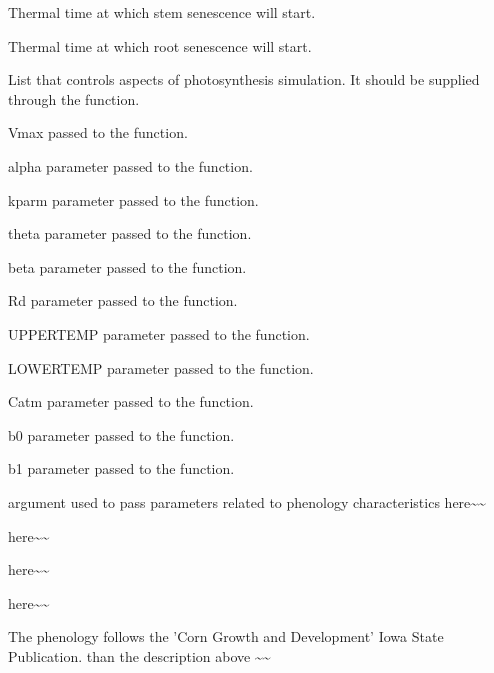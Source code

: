 \documentclass[letterpaper]{book}
\begin{document}
\begin{Arguments}
\begin{ldescription}
 Thermal time at which stem senescence will
start.

 Thermal time at which root senescence will
start.

\item[\code{photoControl}] List that controls aspects of
photosynthesis simulation. It should be supplied through
the  function.

 Vmax passed to the 
function.

 alpha parameter passed to the
 function.

 kparm parameter passed to the
 function.

 theta parameter passed to the
 function.

 beta parameter passed to the
 function.

 Rd parameter passed to the
 function.

 UPPERTEMP parameter passed to the
 function.

 LOWERTEMP parameter passed to the
 function.

 Catm parameter passed to the
 function.

 b0 parameter passed to the
 function.

 b1 parameter passed to the
 function.

\item[\code{canePhenoControl}] argument used to pass parameters
related to phenology characteristics 
 here\textasciitilde{}\textasciitilde{}

\item[\code{soilControl}] 
here\textasciitilde{}\textasciitilde{}

\item[\code{nitroControl}] 
here\textasciitilde{}\textasciitilde{}

\item[\code{centuryControl}] 
here\textasciitilde{}\textasciitilde{}
\end{ldescription}
\end{Arguments}
%
\begin{Details}\relax
The phenology follows the 'Corn Growth and Development'
Iowa State Publication. 
than the description above \textasciitilde{}\textasciitilde{}
\end{Details}
\end{document}
